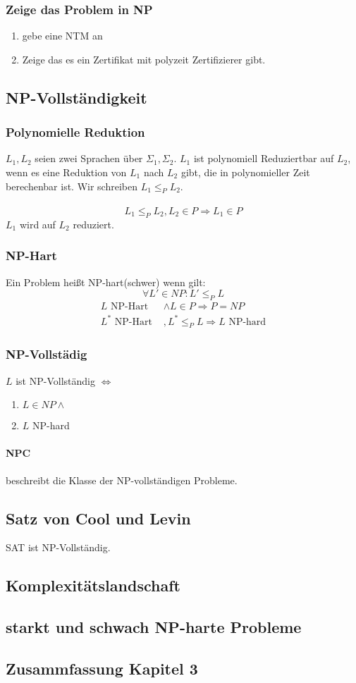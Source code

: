 \documentclass[a4paper, 10pt]{article}
\theoremstyle{definition}
\begin{document}
\subsubsection{Zeige das Problem in NP}
\begin{enumerate}
    \item gebe eine NTM an
    \item Zeige das es ein Zertifikat mit polyzeit Zertifizierer gibt.
\end{enumerate}
\subsection{NP-Vollständigkeit}
\subsubsection{Polynomielle Reduktion}
$L_1,L_2$ seien zwei Sprachen über $\Sigma_1,\Sigma_2$. $L_1$ ist polynomiell Reduziertbar auf $L_2$, wenn es eine Reduktion von $L_1$ nach $L_2$ gibt, die in polynomieller Zeit berechenbar ist. Wir schreiben $L_1\leq_P L_2$.\\ \\
\begin{equation*}
    L_1\leq_P L_2, L_2\in P\Rightarrow L_1\in P
\end{equation*}
$L_1$ wird auf $L_2$ reduziert.
\subsubsection{NP-Hart}
Ein Problem heißt NP-hart(schwer) wenn gilt:
\begin{equation*}
    \forall L'\in NP:L'\leq_P L
\end{equation*}
\begin{align*}
    L \text{ NP-Hart }&\land L\in P\Rightarrow P=NP\\
    L^* \text{ NP-Hart }&,L^*\leq_PL\Rightarrow L \text{ NP-hard}
\end{align*}
    
    

\subsubsection{NP-Vollstädig}
$L$ ist NP-Vollständig $\Leftrightarrow$
\begin{enumerate}
    \item $L\in NP \land$
    \item $L$ NP-hard
\end{enumerate}
\paragraph{NPC} beschreibt die Klasse der NP-vollständigen Probleme.
\subsection{Satz von Cool und Levin}
SAT ist NP-Vollständig.
\subsection{Komplexitätslandschaft}
\subsection{starkt und schwach NP-harte Probleme}
\subsection{Zusammfassung Kapitel 3}
\end{document}
